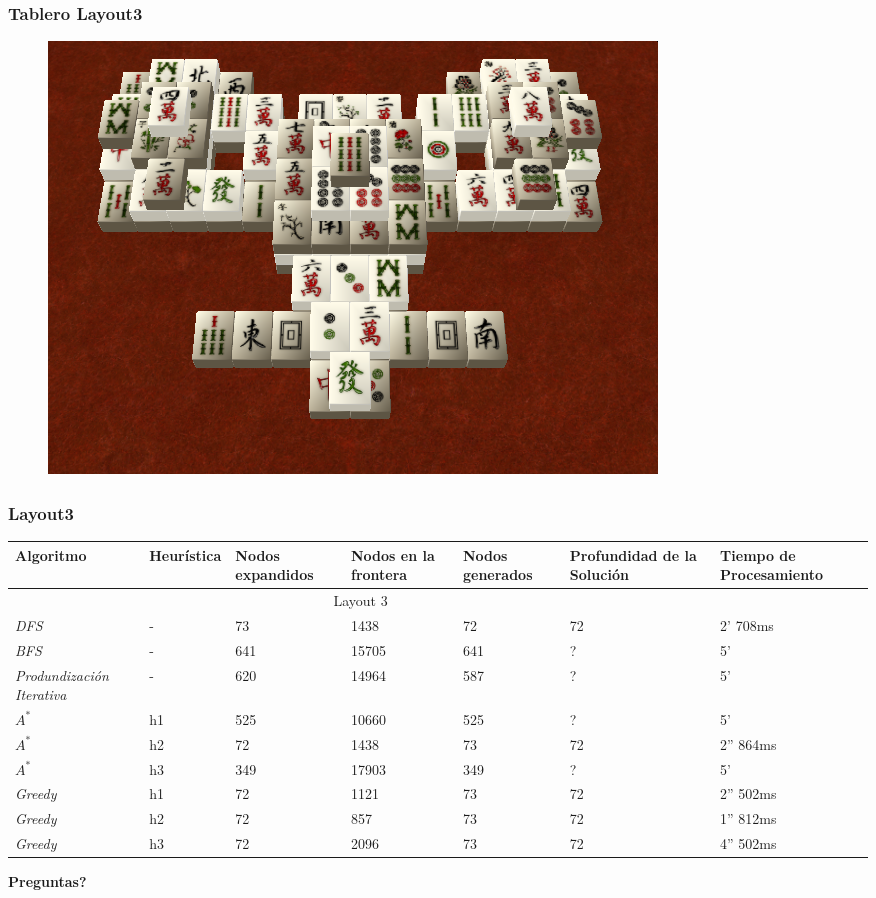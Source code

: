 \documentclass{beamer}
\begin{document}
\begin{frame}
\frametitle{Tablero Layout3}
\begin{figure}[hb]
	\includegraphics[scale=0.3]{../Boards/Layout4.png}
	 \label{fig:layout4}
\end{figure}
\end{frame}

\begin{frame}
\frametitle{Layout3}

\tiny{
\begin{table}[h]
\begin{center}
	\begin{tabular}{|p{1.3cm}|p{1.0cm}|p{1cm}|p{1cm}|p{1cm}|p{1cm}|p{2cm}|}
	\hline
	 Algoritmo & Heur\'istica & Nodos expandidos & Nodos en la frontera & Nodos generados & Profundidad de la Soluci\'on & Tiempo de Procesamiento\\
	\hline \hline
		 \multicolumn{6}{|c|}{Layout 3} \\
	\hline
	\textit{DFS} & - & 73 & 1438 & 72 & 72 & 2' 708ms \\
	\textit{BFS} & - & 641 & 15705 & 641 & ? & 5' \\
	\textit{Produndizaci\'on Iterativa} & - & 620 & 14964 & 587 & ? & 5' \\	
	\textit{$A^*$} & h1 & 525 &  10660 & 525 & ? & 5' \\
	\textit{$A^*$} & h2 & 72 & 1438 & 73 & 72 & 2'' 864ms\\
	\textit{$A^*$} & h3 & 349 & 17903 & 349 & ? & 5' \\	
	\textit{Greedy} & h1 & 72 & 1121 & 73 & 72 & 2'' 502ms\\
	\textit{Greedy} & h2 & 72 & 857 & 73 & 72 & 1'' 812ms\\
	\textit{Greedy} & h3 & 72 & 2096 & 73 & 72 & 4'' 502ms\\
	\hline
	\end{tabular}
\end{center}
\label{tab:costLayout4}
\end{table}}

\end{frame}

\begin{frame}
\textbf{\Huge{Preguntas?}}
\end{frame}
\end{document}
